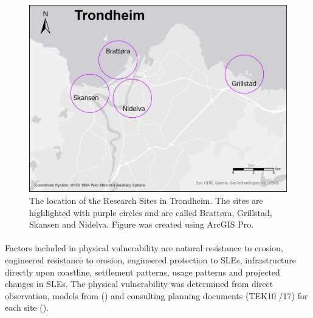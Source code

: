 \begin{figure} [h]
    \centering
    \includegraphics[width=1.0\textwidth]{fig/trondheim_research_sites_grey_circles.png}
    \caption{ The location of the Research Sites in Trondheim. The sites are highlighted with purple circles and are called Brattøra, Grillstad, Skansen and Nidelva. Figure was created using ArcGIS Pro.}
    \label{fig:research sites}
\end{figure}

\paragraph{}

Factors included in physical vulnerability are natural resistance to erosion, engineered resistance to erosion, engineered protection to SLEs, infrastructure directly upon coastline, settlement patterns, usage patterns and projected changes in SLEs. The physical vulnerability was determined from direct observation,  models from (\cite{kartverket_se_2020}) and consulting planning documents (TEK10 /17) for each site (\cite{miljoenheten_og_byplankontoret_trondheim_kommune_9-notat-om-havnivastigning-og-stormflo---hensyn-i-arealplanlegging-nyhavnapdf_2020}). 


